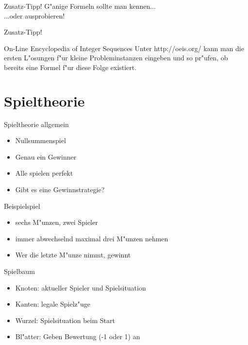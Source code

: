 \documentclass[18pt]{beamer}
\begin{document}
\begin{frame}{Zusatz-Tipp!}
G"anige Formeln sollte man kennen... \\
...oder ausprobieren! \\

\end{frame}

\begin{frame}{Zusatz-Tipp!}
\begin{block}{On-Line Encyclopedia of Integer Sequences}
Unter http://oeis.org/ kann man die ersten L"osungen f"ur kleine Probleminstanzen eingeben und so pr"ufen, ob bereits eine Formel f"ur diese Folge existiert.
\end{block}

\end{frame}


\section{Spieltheorie}
\begin{frame}{Spieltheorie allgemein}
\begin{itemize}
\item Nullsummenspiel
\item Genau ein Gewinner
\item Alle spielen perfekt
\item Gibt es eine Gewinnstrategie?
\end{itemize}
\end{frame}

\begin{frame}{Beispielspiel}
\begin{itemize}
\item sechs M"unzen, zwei Spieler
\pause
\item immer abwechselnd maximal drei M"unzen nehmen
\pause
\item Wer die letzte M"unze nimmt, gewinnt
\end{itemize}
\end{frame}

\begin{frame}{Spielbaum}
\begin{itemize}
\item Knoten: aktueller Spieler und Spielsituation
\pause
\item Kanten: legale Spielz"uge
\pause
\item Wurzel: Spielsituation beim Start
\pause
\item Bl"atter: Geben Bewertung (-1 oder 1) an
\pause
\end{itemize}
\end{frame}
\end{document}
